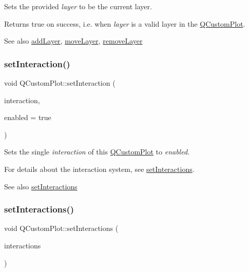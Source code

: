 Sets the provided {\itshape layer} to be the current layer.

Returns true on success, i.\+e. when {\itshape layer} is a valid layer in the \hyperlink{classQCustomPlot}{Q\+Custom\+Plot}.

\begin{DoxySeeAlso}{See also}
\hyperlink{classQCustomPlot_ad5255393df078448bb6ac83fa5db5f52}{add\+Layer}, \hyperlink{classQCustomPlot_ae896140beff19424e9e9e02d6e331104}{move\+Layer}, \hyperlink{classQCustomPlot_a40f75e342c5eaab6a86066a42a0e2a94}{remove\+Layer} 
\end{DoxySeeAlso}
\mbox{\label{classQCustomPlot_a422bf1bc6d56dac75a3d805d9a65902c}} 
\subsubsection{\texorpdfstring{set\+Interaction()}{setInteraction()}}
{\footnotesize\ttfamily void Q\+Custom\+Plot\+::set\+Interaction (\begin{DoxyParamCaption}\item[{const \hyperlink{namespaceQCP_a2ad6bb6281c7c2d593d4277b44c2b037}{Q\+C\+P\+::\+Interaction} \&}]{interaction,  }\item[{bool}]{enabled = {\ttfamily true} }\end{DoxyParamCaption})}

Sets the single {\itshape interaction} of this \hyperlink{classQCustomPlot}{Q\+Custom\+Plot} to {\itshape enabled}.

For details about the interaction system, see \hyperlink{classQCustomPlot_a5ee1e2f6ae27419deca53e75907c27e5}{set\+Interactions}.

\begin{DoxySeeAlso}{See also}
\hyperlink{classQCustomPlot_a5ee1e2f6ae27419deca53e75907c27e5}{set\+Interactions} 
\end{DoxySeeAlso}
\mbox{\label{classQCustomPlot_a5ee1e2f6ae27419deca53e75907c27e5}} 
\subsubsection{\texorpdfstring{set\+Interactions()}{setInteractions()}}
{\footnotesize\ttfamily void Q\+Custom\+Plot\+::set\+Interactions (\begin{DoxyParamCaption}\item[{const Q\+C\+P\+::\+Interactions \&}]{interactions }\end{DoxyParamCaption})}

